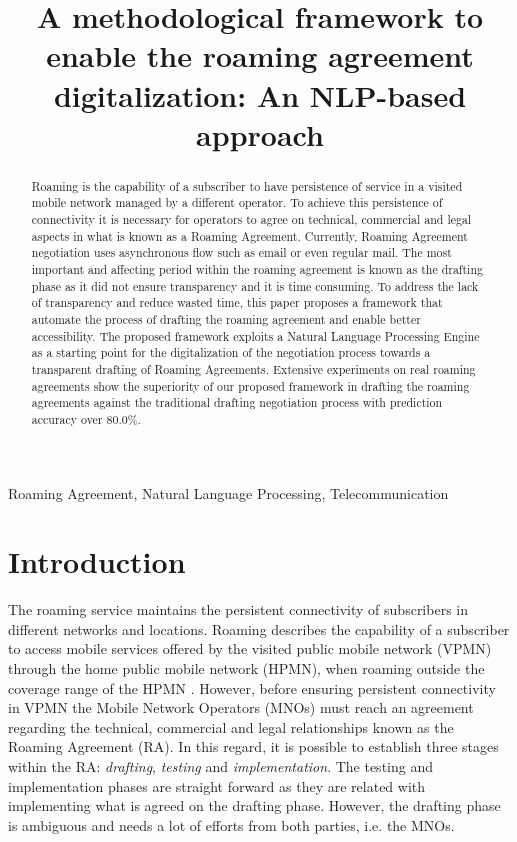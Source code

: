 \documentclass[conference]{style/IEEEtran}
\begin{document}
\title{A methodological framework to enable the roaming agreement digitalization: An NLP-based approach\\}

\maketitle

\begin{abstract}
Roaming is the capability of a subscriber to have persistence of service in a visited mobile network managed by a different operator. To achieve this persistence of connectivity it is necessary for operators to agree on technical, commercial and legal aspects in what is known as a Roaming Agreement. Currently, Roaming Agreement negotiation uses asynchronous flow such as email or even regular mail. 
The most important and affecting period within the roaming agreement is known as the drafting phase as it did not ensure transparency and it  is time consuming. To address the lack of transparency and reduce wasted time, this paper proposes a framework that automate the process of drafting the roaming agreement and enable better accessibility. The proposed framework exploits a Natural Language Processing Engine as a starting point for the digitalization of the negotiation process towards a transparent drafting of Roaming Agreements. Extensive experiments on real roaming agreements show the superiority of our proposed framework in drafting the roaming agreements against the traditional drafting negotiation process with prediction accuracy over 80.0\%.
\end{abstract}

\begin{IEEEkeywords}
Roaming Agreement, Natural Language Processing, Telecommunication
\end{IEEEkeywords}

\section{Introduction}
The roaming service maintains the persistent connectivity of subscribers in different networks and locations. Roaming describes the capability of a subscriber to access mobile services offered by the visited public mobile network (VPMN) through the home public mobile network (HPMN), when roaming outside the coverage range of the HPMN \cite{Tanaka2013}. However, before ensuring persistent connectivity in VPMN the Mobile Network Operators (MNOs) must reach an agreement regarding the technical, commercial and legal relationships known as the Roaming Agreement (RA). In this regard, it is possible to establish three stages within the RA: \textit{drafting}, \textit{testing} and \textit{implementation}. The testing and implementation phases are straight forward as they are related with implementing what is agreed on the drafting phase. However, the drafting phase is ambiguous and needs a lot of efforts from both parties, i.e. the MNOs. 
\end{document}

